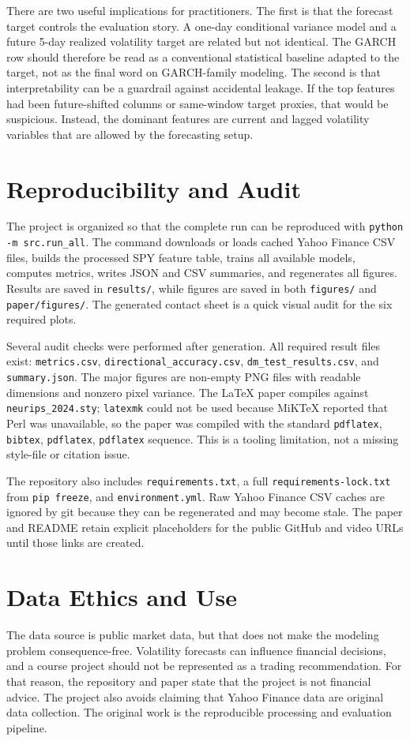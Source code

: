 \documentclass{article}
\begin{document}
There are two useful implications for practitioners. The first is that the forecast target controls the evaluation story. A one-day conditional variance model and a future 5-day realized volatility target are related but not identical. The GARCH row should therefore be read as a conventional statistical baseline adapted to the target, not as the final word on GARCH-family modeling. The second is that interpretability can be a guardrail against accidental leakage. If the top features had been future-shifted columns or same-window target proxies, that would be suspicious. Instead, the dominant features are current and lagged volatility variables that are allowed by the forecasting setup.

\section{Reproducibility and Audit}
The project is organized so that the complete run can be reproduced with \texttt{python -m src.run\_all}. The command downloads or loads cached Yahoo Finance CSV files, builds the processed SPY feature table, trains all available models, computes metrics, writes JSON and CSV summaries, and regenerates all figures. Results are saved in \texttt{results/}, while figures are saved in both \texttt{figures/} and \texttt{paper/figures/}. The generated contact sheet is a quick visual audit for the six required plots.

Several audit checks were performed after generation. All required result files exist: \texttt{metrics.csv}, \texttt{directional\_accuracy.csv}, \texttt{dm\_test\_results.csv}, and \texttt{summary.json}. The major figures are non-empty PNG files with readable dimensions and nonzero pixel variance. The LaTeX paper compiles against \texttt{neurips\_2024.sty}; \texttt{latexmk} could not be used because MiKTeX reported that Perl was unavailable, so the paper was compiled with the standard \texttt{pdflatex}, \texttt{bibtex}, \texttt{pdflatex}, \texttt{pdflatex} sequence. This is a tooling limitation, not a missing style-file or citation issue.

The repository also includes \texttt{requirements.txt}, a full \texttt{requirements-lock.txt} from \texttt{pip freeze}, and \texttt{environment.yml}. Raw Yahoo Finance CSV caches are ignored by git because they can be regenerated and may become stale. The paper and README retain explicit placeholders for the public GitHub and video URLs until those links are created.

\section{Data Ethics and Use}
The data source is public market data, but that does not make the modeling problem consequence-free. Volatility forecasts can influence financial decisions, and a course project should not be represented as a trading recommendation. For that reason, the repository and paper state that the project is not financial advice. The project also avoids claiming that Yahoo Finance data are original data collection. The original work is the reproducible processing and evaluation pipeline.
\end{document}
